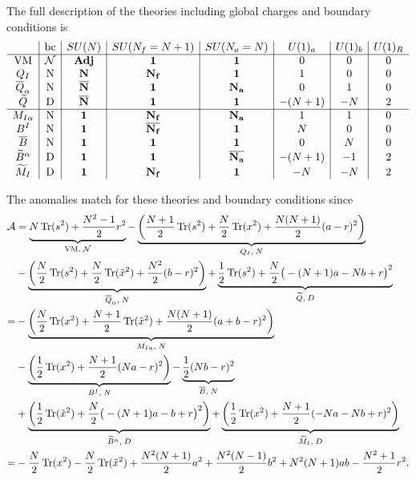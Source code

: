 \documentclass[12pt]{article}
\newcommand{\Acal}{\mathcal{A}}
\newcommand{\Ncal}{\mathcal{N}}
\DeclareMathOperator*{\Tr}{{\rm Tr}}
\numberwithin{equation}{section}
\begin{document}
The full description of the theories including global charges and boundary conditions is 
\begin{align}
\label{SUN_Np1_charges}
\begin{array}{c|c|c|c|c|c|c|c}
& \textrm{bc} & SU(N) & SU(N_f = N+1) & SU(N_a = N) & U(1)_a & U(1)_b & U(1)_R \\ \hline
\textrm{VM} & \mathcal{N} & {\bf Adj} & {\bf 1} & {\bf 1} & 0 & 0 & 0 \\
Q_I & \textrm{N} & {\bf N} & {\bf N_f} & {\bf 1} & 1 & 0 & 0 \\
\overline{Q}_{\alpha} & \textrm{N} & {\bf \overline{N}} & {\bf 1} & {\bf N_a} & 0 & 1 & 0 \\
\widetilde{Q} & \textrm{D} & {\bf \overline{N}} & {\bf 1} & {\bf 1} & -(N + 1) & -N & 2 \\
 \hline
M_{I \alpha} & \textrm{N} & {\bf 1} & {\bf N_f} & {\bf N_a} & 1 & 1 & 0 \\
B^I & \textrm{N} & {\bf 1} & {\bf \overline{N_f}} & {\bf 1} & N & 0 & 0 \\
\overline{B} & \textrm{N} & {\bf 1} & {\bf 1} & {\bf 1} & 0 & N & 0 \\
\widetilde{B}^{\alpha} & \textrm{D} & {\bf 1} & {\bf 1} & {\bf \overline{N_a}} & -(N + 1) & -1 & 2 \\
\widetilde{M}_I & \textrm{D} & {\bf 1} & {\bf N_f} & {\bf 1} & -N & -N & 2 \\
\end{array}
\end{align}

The anomalies match for these theories and boundary conditions since
\begin{align}
\label{bdy_SUN_Np1_anom}
\Acal & = \underbrace{N\Tr(s^2) + \frac{N^2 - 1}{2}r^2}_{\textrm{VM}, \; \Ncal}
 - \underbrace{\left( \frac{N+1}{2} \Tr(s^2) + \frac{N}{2} \Tr(x^2) + \frac{N(N+1)}{2}(a-r)^2 \right)}_{Q_I, \; N}
  \nonumber \\
 & - \underbrace{\left( \frac{N}{2} \Tr(s^2) + \frac{N}{2} \Tr(\tilde{x}^2) + \frac{N^2}{2}(b-r)^2 \right)}_{\overline{Q}_{\alpha}, \; N}
 + \underbrace{\frac{1}{2} \Tr(s^2) + \frac{N}{2}\big( -(N+1)a-Nb+r \big)^2}_{\widetilde{Q}, \; D}
  \nonumber \\
  = & - \underbrace{\left( \frac{N}{2} \Tr(x^2) + \frac{N+1}{2} \Tr(\tilde{x}^2) + \frac{N(N+1)}{2}(a+b-r)^2 \right)}_{M_{I \alpha}, \; N}
  \nonumber \\
 &  - \underbrace{\left( \frac{1}{2} \Tr(x^2) + \frac{N+1}{2}(Na-r)^2 \right)}_{B^I, \; N}
   - \underbrace{\frac{1}{2}(Nb-r)^2}_{\overline{B}, \; N}
   \nonumber \\
 & + \underbrace{\left( \frac{1}{2} \Tr(\tilde{x}^2) + \frac{N}{2}\big( -(N+1)a-b+r \big)^2 \right)}_{\widetilde{B}^{\alpha}, \; D}
 + \underbrace{\left( \frac{1}{2} \Tr(x^2) + \frac{N+1}{2}(-Na-Nb+r)^2 \right)}_{\widetilde{M}_I, \; D}
  \nonumber \\
  = & - \frac{N}{2} \Tr(x^2) - \frac{N}{2} \Tr(\tilde{x}^2) + \frac{N^2(N+1)}{2}a^2 + \frac{N^2(N-1)}{2}b^2 + N^2(N+1)ab - \frac{N^2 + 1}{2}r^2.
\end{align}
\end{document}
